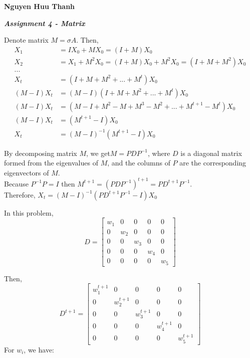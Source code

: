 \documentclass[11pt]{article}
\begin{document}
\textbf{{\huge Nguyen Huu Thanh}}


\textit{\textbf{Assignment 4 - Matrix}}
\vspace{5mm}

Denote matrix $M = \sigma A$. Then, \\
\begin{equation*} 
\begin{split}
X_1 &= IX_0 + MX_0
 = (I + M)X_0\\ 
X_2 &= X_1 + M^2X_0 
= (I + M)X_0 + M^2X_0 
= (I + M + M^2)X_0\\
...\\
X_t &= (I + M + M^2 + ... + M^t)X_0 \\
(M-I)X_t &= (M-I)(I + M + M^2 + ... + M^t)X_0 \\
(M-I)X_t &=(M - I + M^2 - M + M^3 - M^2 + ... + M^{t+1} - M^t)X_0\\
(M-I)X_t &=(M^{t+1} - I) X_0\\
X_t &= (M-I)^{-1}(M^{t+1} - I)X_0
\end{split}
\end{equation*}

By decomposing matrix $M$, we get$M = PDP^{-1}$, where $D$ is a diagonal matrix formed from the eigenvalues of $M$, and the columns
of $P$ are the corresponding eigenvectors of $M$. \\


Because $P^{-1}P = I$ then $M^{t+1}=(PDP^{-1})^{t+1} = PD^{t+1}P^{-1}$.\\

Therefore, $X_t = (M-I)^{-1}(PD^{t+1}P^{-1} - I)X_0$


In this problem, \\
\[ D = 
\begin{bmatrix}
w_1 &0 &0 &0 &0\\
0 &w_2 &0 &0 &0\\
0 &0 &w_3 &0 &0\\
0 &0 &0 &w_4 &0\\
0 &0 &0 &0 &w_5
\end{bmatrix}
\]

Then, \\
\[ D^{t+1} = 
\begin{bmatrix}
w_1^{t+1} &0 &0 &0 &0\\
0 &w_2^{t+1} &0 &0 &0\\
0 &0 &w_3^{t+1} &0 &0\\
0 &0 &0 &w_4^{t+1} &0\\
0 &0 &0 &0 &w_5^{t+1}
\end{bmatrix}
\]
For $w_i$, we have: \\
\end{document}
